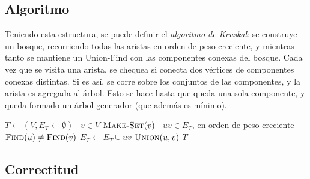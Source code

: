 \documentclass[a4paper]{report}
\newcommand{\Each}{\kw{each}\ }
\begin{document}
\subsection{Algoritmo}

Teniendo esta estructura, se puede definir el \textit{algoritmo de Kruskal}: se construye un bosque, recorriendo todas las aristas en orden de peso creciente, y mientras tanto se mantiene un Union-Find con las componentes conexas del bosque. Cada vez que se visita una arista, se chequea si conecta dos vértices de componentes conexas distintas. Si es así, se corre  sobre los conjuntos de las componentes, y la arista es agregada al árbol. Esto se hace hasta que queda una sola componente, y queda formado un árbol generador (que además es mínimo).

\begin{codebox}
    \li $T \gets (V, E_T \gets \emptyset)$
    \li \For \Each $v \in V$ \Do
    \li $\textnormal{\scshape Make-Set}(v)$
    \End
    \li \For \Each $uv \in E_T$, en orden de peso creciente \Do
    \li \If $\textnormal{\scshape Find}(u) \neq \textnormal{\scshape Find}(v)$ \Then
    \li $E_T \gets E_T \cup {uv}$
    \li $\textnormal{\scshape Union}(u, v)$
    \End
    \Return $T$
\end{codebox}

\subsection{Correctitud}
\end{document}
